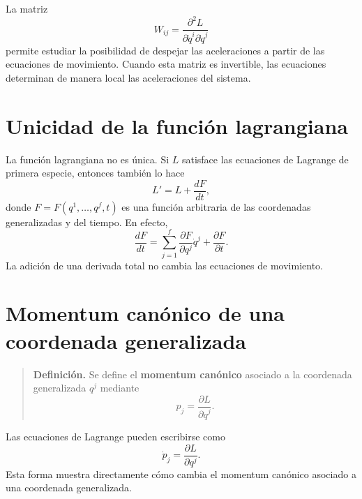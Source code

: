 \documentclass[../apunte_mecanica_clasica.tex]{subfiles}%
\begin{document}
La matriz
\begin{equation}
    W_{ij}=\frac{\partial^2 L}{\partial \dot q^i\partial \dot q^j}
    \label{eq:mr-hessiano-lagrangiano}
\end{equation}
permite estudiar la posibilidad de despejar las aceleraciones a partir de las ecuaciones de movimiento. Cuando esta matriz es invertible, las ecuaciones determinan de manera local las aceleraciones del sistema.

\section{Unicidad de la función lagrangiana}
\label{sec:mr-unicidad-lagrangiana}

La función lagrangiana no es única. Si $L$ satisface las ecuaciones de Lagrange de primera especie, entonces también lo hace
\begin{equation}
    L'=L+\frac{dF}{dt},
    \label{eq:mr-lagrangiano-mas-derivada-total}
\end{equation}
donde $F=F(q^1,\dots,q^f,t)$ es una función arbitraria de las coordenadas generalizadas y del tiempo. En efecto,
\begin{equation}
    \frac{dF}{dt}
    =\sum_{j=1}^{f}\frac{\partial F}{\partial q^j}\dot q^j
    +\frac{\partial F}{\partial t}.
    \label{eq:mr-derivada-total-f}
\end{equation}
La adición de una derivada total no cambia las ecuaciones de movimiento.

\section{Momentum canónico de una coordenada generalizada}
\label{sec:mr-momentum-canonico}

\begin{quote}
\textbf{Definición.} Se define el \textbf{momentum canónico} asociado a la coordenada generalizada $q^j$ mediante
\begin{equation}
    p_j=\frac{\partial L}{\partial \dot q^j}.
    \label{eq:mr-momentum-canonico}
\end{equation}
\end{quote}

Las ecuaciones de Lagrange pueden escribirse como
\begin{equation}
    \dot p_j=\frac{\partial L}{\partial q^j}.
    \label{eq:mr-ecuacion-momentum-canonico}
\end{equation}
Esta forma muestra directamente cómo cambia el momentum canónico asociado a una coordenada generalizada.
\end{document}
